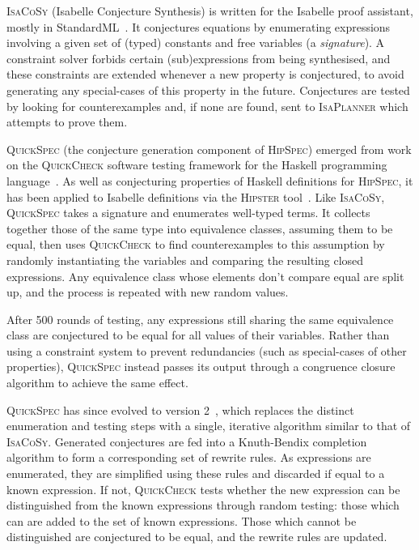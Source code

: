 \textsc{IsaCoSy} (Isabelle Conjecture Synthesis) is written for the Isabelle
proof assistant, mostly in
StandardML~\cite{Johansson.Dixon.Bundy:conjecture-generation}. It conjectures
equations by enumerating expressions involving a given set of (typed) constants
and free variables (a \emph{signature}). A constraint solver forbids certain
(sub)expressions from being synthesised, and these constraints are extended
whenever a new property is conjectured, to avoid generating any special-cases of
this property in the future. Conjectures are tested by looking for
counterexamples and, if none are found, sent to \textsc{IsaPlanner} which
attempts to prove them.

\textsc{QuickSpec} (the conjecture generation component of \textsc{HipSpec})
emerged from work on the \textsc{QuickCheck} software testing framework for the
Haskell programming language~\cite{claessen2011quickcheck}. As well as
conjecturing properties of Haskell definitions for \textsc{HipSpec}, it has been
applied to Isabelle definitions via the \textsc{Hipster} tool~\cite{Hipster}.
Like \textsc{IsaCoSy}, \textsc{QuickSpec} takes a signature and enumerates
well-typed terms. It collects together those of the same type into equivalence
classes, assuming them to be equal, then uses \textsc{QuickCheck} to find
counterexamples to this assumption by randomly instantiating the variables and
comparing the resulting closed expressions. Any equivalence class whose elements
don't compare equal are split up, and the process is repeated with new random
values.

After 500 rounds of testing, any expressions still sharing the same equivalence
class are conjectured to be equal for all values of their variables. Rather than
using a constraint system to prevent redundancies (such as special-cases of
other properties), \textsc{QuickSpec} instead passes its output through a
congruence closure algorithm to achieve the same effect.

\textsc{QuickSpec} has since evolved to version 2~\cite{smallbone2017quick},
which replaces the distinct enumeration and testing steps with a single,
iterative algorithm similar to that of \textsc{IsaCoSy}. Generated conjectures
are fed into a Knuth-Bendix completion algorithm to form a corresponding set of
rewrite rules. As expressions are enumerated, they are simplified using these
rules and discarded if equal to a known expression. If not, \textsc{QuickCheck}
tests whether the new expression can be distinguished from the known expressions
through random testing: those which can are added to the set of known
expressions. Those which cannot be distinguished are conjectured to be equal,
and the rewrite rules are updated.

